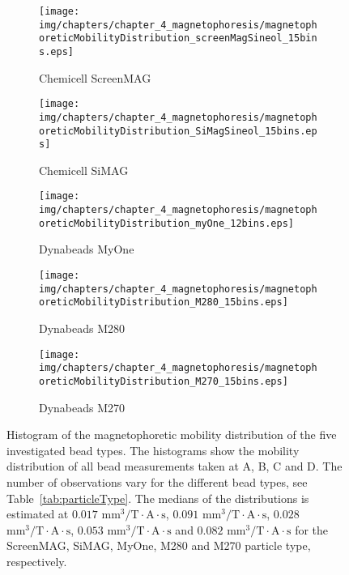 \begin{figure}
\begin{subfigure}[b]{.48\linewidth}
\texttt{[image: img/chapters/chapter\_4\_magnetophoresis/magnetophoreticMobilityDistribution\_screenMagSineol\_15bins.eps]}
\caption{Chemicell ScreenMAG}\label{fig:mobilityHistogram_ScreenMag}
\end{subfigure}
\hfill
\begin{subfigure}[b]{.48\linewidth}
\texttt{[image: img/chapters/chapter\_4\_magnetophoresis/magnetophoreticMobilityDistribution\_SiMagSineol\_15bins.eps]}
\caption{Chemicell SiMAG}\label{fig:mobilityHistogram_SiMag}
\end{subfigure}
\begin{subfigure}[b]{.48\linewidth}
\texttt{[image: img/chapters/chapter\_4\_magnetophoresis/magnetophoreticMobilityDistribution\_myOne\_12bins.eps]}
\caption{Dynabeads MyOne}\label{fig:mobilityHistogram_MyOne}
\end{subfigure}
\hfill
\begin{subfigure}[b]{.48\linewidth}
\texttt{[image: img/chapters/chapter\_4\_magnetophoresis/magnetophoreticMobilityDistribution\_M280\_15bins.eps]}
\caption{Dynabeads M280}\label{fig:mobilityHistogram_M280}
\end{subfigure}
\begin{subfigure}[b]{.48\linewidth}
\texttt{[image: img/chapters/chapter\_4\_magnetophoresis/magnetophoreticMobilityDistribution\_M270\_15bins.eps]}
\caption{Dynabeads M270}\label{fig:mobilityHistogram_M270}
\end{subfigure}
\caption[Histogram of magnetophoretic mobility of various superparamagnetic particles]{Histogram of the magnetophoretic mobility distribution of the five investigated bead types. The histograms show the mobility distribution of all bead measurements taken at A, B, C and D. The number of observations vary for the different bead types, see Table~\ref{tab:particleType}. The medians of the distributions is estimated at $0.017$ $\text{mm}^{3}/\text{T}\cdot\text{A}\cdot\text{s}$, $0.091$ $\text{mm}^{3}/\text{T}\cdot\text{A}\cdot\text{s}$, $0.028$ $\text{mm}^{3}/\text{T}\cdot\text{A}\cdot\text{s}$, $0.053$ $\text{mm}^{3}/\text{T}\cdot\text{A}\cdot\text{s}$ and $0.082$ $\text{mm}^{3}/\text{T}\cdot\text{A}\cdot\text{s}$ for the ScreenMAG, SiMAG, MyOne, M280 and M270 particle type, respectively.}
\label{fig:magnetophoreticMobilityDistributionHistogram}
\end{figure}

